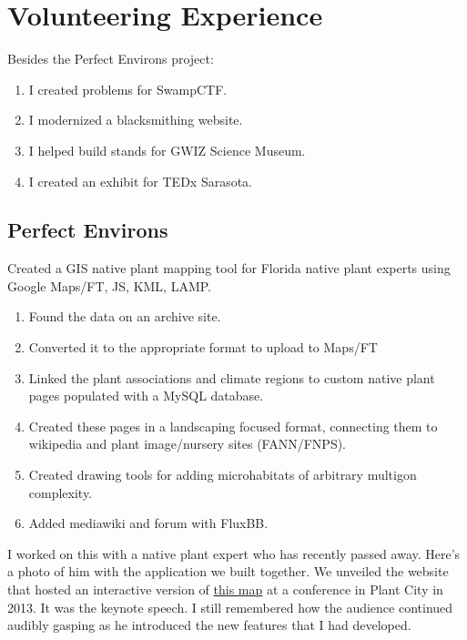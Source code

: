\documentclass[../r.tex]{subfiles}
\begin{document}
\section{Volunteering Experience}
Besides the Perfect Environs project:
\begin{enumerate}
\item I created problems for SwampCTF.
\item I modernized a blacksmithing website.
\item I helped build stands for GWIZ Science Museum.
\item I created an exhibit for TEDx Sarasota.
\end{enumerate}
\subsection{Perfect Environs}
Created a GIS native plant mapping tool for Florida native plant experts using Google Maps/FT, JS, KML, LAMP.
\begin{enumerate}
\item Found the data on an archive site. 
\item Converted it to the appropriate format to upload to Maps/FT
\item Linked the plant associations and climate regions to custom native plant pages populated with a MySQL database.
\item Created these pages in a landscaping focused format, connecting them to wikipedia and plant image/nursery sites (FANN/FNPS).
\item Created drawing tools for adding microhabitats of arbitrary multigon complexity. 
\item Added mediawiki and forum with FluxBB.
\end{enumerate}

I worked on this with a native plant expert who has recently passed away.  Here's a photo of him with the application we built together.  We unveiled the website that hosted an interactive version of \href{https://www.plantrealflorida.org/images/maps/vegetation_map_large.pdf}{this map} at a conference in Plant City in 2013. It was the keynote speech. I still remembered how the audience continued audibly gasping as he introduced the new features that I had developed.
\end{document}

